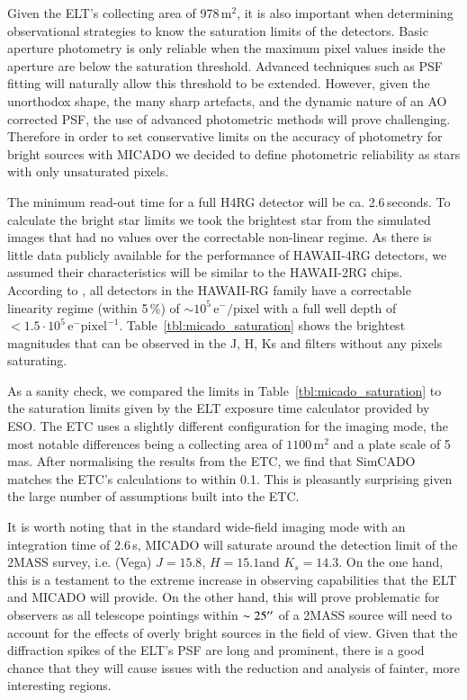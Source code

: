 Given the ELT's collecting area of 978\,m$^2$, it is also important when determining observational strategies to know the saturation limits of the detectors. Basic aperture photometry is only reliable when the maximum pixel values inside the aperture are below the saturation threshold. Advanced techniques such as PSF fitting will naturally allow this threshold to be extended. However, given the unorthodox shape, the many sharp artefacts, and the dynamic nature of an AO corrected PSF, the use of advanced photometric methods will prove challenging. Therefore in order to set conservative limits on the accuracy of photometry for bright sources with MICADO we decided to define photometric reliability as stars with only unsaturated pixels.

The minimum read-out time for a full H4RG detector will be ca. 2.6\,seconds. 
To calculate the bright star limits we took the brightest star from the simulated images that had no values over the correctable non-linear regime. As there is little data publicly available for the performance of HAWAII-4RG detectors, we assumed their characteristics will be similar to the HAWAII-2RG chips. According to \citet{hawaii2rg}, all detectors in the HAWAII-RG family have a correctable linearity regime (within 5\,\%) of $\sim 10^{5}\,\mathrm{e}^{-}/\mathrm{pixel}$ with a full well depth of $<1.5 \cdot 10^{5}\,\mathrm{e}^{-}\mathrm{pixel}^{-1}$. Table~\ref{tbl:micado_saturation} shows the brightest magnitudes that can be observed in the J, H, Ks and \brgamma filters without any pixels saturating. 

As a sanity check, we compared the limits in Table~\ref{tbl:micado_saturation} to the saturation limits given by the ELT exposure time calculator provided by ESO. The ETC uses a slightly different configuration for the imaging mode, the most notable differences being a collecting area of $1100\,\mathrm{m^2}$ and a plate scale of 5\,mas. After normalising the results from the ETC, we find that SimCADO matches the ETC's calculations to within 0.1\m. This is pleasantly surprising given the large number of assumptions built into the ETC.

It is worth noting that in the standard wide-field imaging mode with an integration time of 2.6\,s, MICADO will saturate around the detection limit of the 2MASS survey, i.e. (Vega) $J=15.8$\m, $H=15.1$\m and $K_{s}=14.3$\m \citep{2mass}. On the one hand, this is a testament to the extreme increase in observing capabilities that the ELT and MICADO will provide. On the other hand, this will prove problematic for observers as all telescope pointings within $\sim 25^{\prime\prime}$ of a 2MASS source will need to account for the effects of overly bright sources in the field of view. Given that the diffraction spikes of the ELT's PSF are long and prominent, there is a good chance that they will cause issues with the reduction and analysis of fainter, more interesting regions. 


